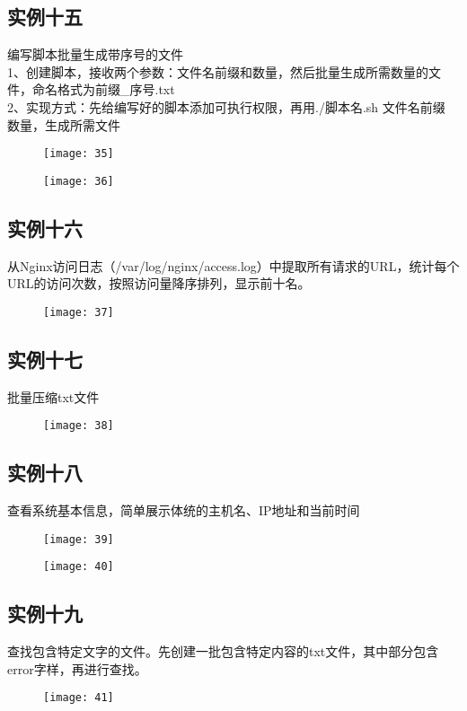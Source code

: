 \documentclass[12pt,letterpaper]{article}
\begin{document}
\subsection{实例十五}
编写脚本批量生成带序号的文件\\
1、创建脚本，接收两个参数：文件名前缀和数量，然后批量生成所需数量的文件，命名格式为前缀\_序号.txt\\
2、实现方式：先给编写好的脚本添加可执行权限，再用./脚本名.sh 文件名前缀 数量，生成所需文件
\begin{figure}[H]
\centering
\texttt{[image: 35]}
\end{figure}
\vspace{-6mm}
\begin{figure}[H]
\centering
\texttt{[image: 36]}
\end{figure}

\subsection{实例十六}
从Nginx访问日志（/var/log/nginx/access.log）中提取所有请求的URL，统计每个URL的访问次数，按照访问量降序排列，显示前十名。
\begin{figure}[H]
\centering
\texttt{[image: 37]}
\end{figure}

\subsection{实例十七}
批量压缩txt文件
\begin{figure}[H]
\centering
\texttt{[image: 38]}
\end{figure}

\subsection{实例十八}
查看系统基本信息，简单展示体统的主机名、IP地址和当前时间
\begin{figure}[H]
\centering
\texttt{[image: 39]}
\end{figure}
\vspace{-6mm}
\begin{figure}[H]
\centering
\texttt{[image: 40]}
\end{figure}

\subsection{实例十九}
查找包含特定文字的文件。先创建一批包含特定内容的txt文件，其中部分包含error字样，再进行查找。
\begin{figure}[H]
\centering
\texttt{[image: 41]}
\end{figure}
\end{document}
